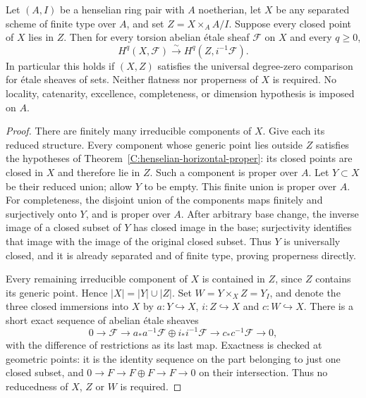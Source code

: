 \begin{theorem}\label{C:henselian-noetherian-pair-comparison}
Let $(A,I)$ be a henselian ring pair with $A$ noetherian,
let $X$ be any separated scheme of finite
type over $A$, and set $Z=X\times_A A/I$. Suppose every closed point of $X$
lies in $Z$. Then for every torsion abelian \'etale sheaf
$\mathcal F$ on $X$ and every $q\ge0$,
\[
 H^q(X,\mathcal F)\xrightarrow{\sim}
 H^q(Z,i^{-1}\mathcal F).
\]
In particular this holds if $(X,Z)$ satisfies the universal
degree-zero comparison for \'etale sheaves of sets. Neither
flatness nor properness of $X$ is required. No locality,
catenarity, excellence, completeness, or dimension hypothesis is
imposed on $A$.
\end{theorem}
\begin{proof}
There are finitely many irreducible components of $X$.
Give each its reduced structure. Every component whose generic
point lies outside $Z$ satisfies the hypotheses of
Theorem~\ref{C:henselian-horizontal-proper}: its closed points are
closed in $X$ and therefore lie in $Z$. Such a component is proper
over $A$. Let $Y\subset X$ be their reduced union; allow $Y$ to be
empty. This finite union is proper over $A$. For completeness,
the disjoint union of the components maps finitely and
surjectively onto $Y$, and is proper over $A$. After arbitrary
base change, the inverse image of a closed subset of $Y$ has
closed image in the base; surjectivity identifies that image
with the image of the original closed subset. Thus $Y$ is
universally closed, and it is already separated and of finite
type, proving properness directly.

Every remaining irreducible component of $X$ is contained in $Z$,
since $Z$ contains its generic point. Hence
$|X|=|Y|\cup|Z|$. Set $W=Y\times_XZ=Y_I$, and denote the three
closed immersions into $X$ by $a:Y\hookrightarrow X$,
$i:Z\hookrightarrow X$ and $c:W\hookrightarrow X$. There is a
short exact sequence of abelian \'etale sheaves
\[
 0\longrightarrow\mathcal F
 \longrightarrow a_*a^{-1}\mathcal F\oplus i_*i^{-1}\mathcal F
 \longrightarrow c_*c^{-1}\mathcal F\longrightarrow0,
\]
with the difference of restrictions as its last map. Exactness
is checked at geometric points: it is the identity sequence on
the part belonging to just one closed subset, and
$0\to F\to F\oplus F\to F\to0$ on their intersection.
Thus no reducedness of $X$, $Z$ or $W$ is required.


\end{proof}

